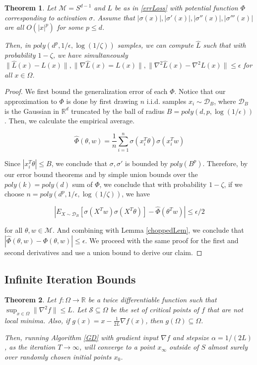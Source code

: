 \documentclass[11pt]{article}
\newtheorem{theorem}{Theorem}[section]
\newcommand{\R}{{\mathbb{R}}}
\begin{document}
\begin{theorem}
\label{genErrBound}
Let $\mathcal{M} = S^{d-1}$ and $L$ be as in \ref{errLoss} with potential function $\Phi$ corresponding to activation $\sigma$. Assume that $|\sigma(x)|, |\sigma'(x)|,|\sigma''(x)|, |\sigma'''(x)|$ are all $O(|x|^p)$ for some $p \leq d$.  

Then, in $poly(d^p,1/\epsilon, \log(1/\zeta))$ samples, we can compute $\hat{L}$ such that with probability $1-\zeta$, we have simultaneously $\|\widehat{L}(x) -L(x)\|, \|\nabla \widehat{L}(x) = L(x)\|, \|\nabla^2\widehat{L}(x) -\nabla^2 L(x)\| \leq \epsilon$ for all $x\in \Omega$.
\end{theorem}

\begin{proof}
We first bound the generalization error of each $\Phi$. Notice that our approximation to $\Phi$ is done by first drawing $n$ i.i.d. samples $x_i \sim \mathcal{D}_B$, where $\mathcal{D}_B$ is the Gaussian in $\R^d$ truncated by the ball of radius $B = poly(d,p,\log(1/\epsilon))$. Then, we calculate the empirical average.

\[\widehat{\Phi}(\theta,w) = \frac{1}{n}\sum_{i=1}^n \sigma(x_i^T\theta)\sigma(x_i^Tw) \]

Since $|x_i^T\theta|\leq B$, we conclude that $\sigma, \sigma'$ is bounded by $poly(B^p)$. Therefore, by our error bound theorems and by simple union bounds over the $poly(k) = poly(d)$ sum of $\Phi$, we conclude that with probability $1-\zeta$, if we choose $n = poly(d^p,1/\epsilon, \log(1/\zeta))$, we have 

\[|E_{X\sim \mathcal{D}_B}[\sigma(X^Tw)\sigma(X^T\theta)] - \widehat{\Phi}(\theta^Tw)| \leq \epsilon/2\]

for all $\theta, w \in \mathcal{M}$. And combining with Lemma \ref{choppedLem}, we conclude that $|\widehat{\Phi}(\theta,w) - \Phi(\theta,w)|\leq \epsilon$. We proceed with the same proof for the first and second derivatives and use a union bound to derive our claim.
\end{proof}

\subsection{Infinite Iteration Bounds} 
\label{InfIter}


\begin{theorem}\cite{lee2016gradient}\cite{PanageasP16}\label{convStrict}
Let $f :\Omega \to \R$ be a twice differentiable function such that $\sup_{x \in \Omega} \|\nabla^2 f\| \leq L$. Let $\mathcal{S} \subseteq \Omega$ be the set of critical points of $f$ that are not local minima. Also, if $g(x) = x - \frac{1}{2L} \nabla f(x)$, then $g(\Omega) \subseteq \Omega$. 

Then, running Algorithm \ref{GD} with gradient input $\nabla f$ and stepsize $\alpha = 1/(2L)$, as the iteration  $T \to\infty$, will converge to a point $x_\infty$ outside of $S$ almost surely over randomly chosen initial points $x_0$. 
\end{theorem}
\end{document}
